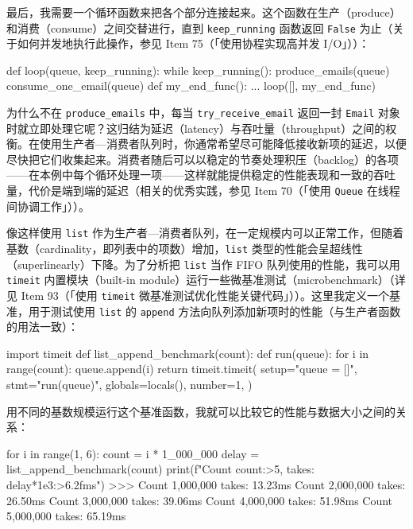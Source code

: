最后，我需要一个循环函数来把各个部分连接起来。这个函数在生产（produce）和消费（consume）之间交替进行，直到 \texttt{keep\_running} 函数返回 \texttt{False} 为止（关于如何并发地执行此操作，参见 Item 75（「使用协程实现高并发 I/O」））：

\begin{codebox}[python]
def loop(queue, keep_running):
    while keep_running():
        produce_emails(queue)
        consume_one_email(queue)
def my_end_func():
    ...
loop([], my_end_func)
\end{codebox}

为什么不在 \texttt{produce\_emails} 中，每当 \texttt{try\_receive\_email} 返回一封 \texttt{Email} 对象时就立即处理它呢？这归结为延迟（latency）与吞吐量（throughput）之间的权衡。在使用生产者—消费者队列时，你通常希望尽可能降低接收新项的延迟，以便尽快把它们收集起来。消费者随后可以以稳定的节奏处理积压（backlog）的各项——在本例中每个循环处理一项——这样就能提供稳定的性能表现和一致的吞吐量，代价是端到端的延迟（相关的优秀实践，参见 Item 70（「使用 \texttt{Queue} 在线程间协调工作」））。

像这样使用 \texttt{list} 作为生产者—消费者队列，在一定规模内可以正常工作，但随着基数（cardinality，即列表中的项数）增加，\texttt{list} 类型的性能会呈超线性（superlinearly）下降。为了分析把 \texttt{list} 当作 FIFO 队列使用的性能，我可以用 \texttt{timeit} 内置模块（built-in module）运行一些微基准测试（microbenchmark）（详见 Item 93（「使用 \texttt{timeit} 微基准测试优化性能关键代码」））。这里我定义一个基准，用于测试使用 \texttt{list} 的 \texttt{append} 方法向队列添加新项时的性能（与生产者函数的用法一致）：

\begin{codebox}[python]
import timeit
def list_append_benchmark(count):
    def run(queue):
        for i in range(count):
            queue.append(i)
    return timeit.timeit(
        setup="queue = []",
        stmt="run(queue)",
        globals=locals(),
        number=1,
    )
\end{codebox}

用不同的基数规模运行这个基准函数，我就可以比较它的性能与数据大小之间的关系：

\begin{codebox}[python]
for i in range(1, 6):
    count = i * 1_000_000
    delay = list_append_benchmark(count)
    print(f"Count {count:>5,} takes: {delay*1e3:>6.2f}ms")
>>>
Count 1,000,000 takes:  13.23ms
Count 2,000,000 takes:  26.50ms
Count 3,000,000 takes:  39.06ms
Count 4,000,000 takes:  51.98ms
Count 5,000,000 takes:  65.19ms
\end{codebox}

